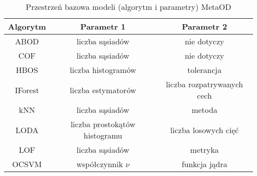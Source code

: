 \begin{table}[]
    \centering
    \begin{tabular}{c|c|c}
    Algorytm & Parametr 1 & Parametr 2 \\ \hline
    ABOD     & liczba sąsiadów & nie dotyczy \\
    COF & liczba sąsiadów & nie dotyczy \\
    HBOS & liczba histogramów & tolerancja \\
    IForest & liczba estymatorów & liczba rozpatrywanych cech \\
    kNN & liczba sąsiadów & metoda \\
    LODA & liczba prostokątów histogramu & liczba losowych cięć \\
    LOF & liczba sąsiadów & metryka \\
    OCSVM &współczynnik $\nu$ & funkcja jądra
    \end{tabular}
    \caption{Przestrzeń bazowa modeli (algorytm i parametry) MetaOD \cite{zhao2020metaod}}
    \label{tab:my_label}
\end{table}